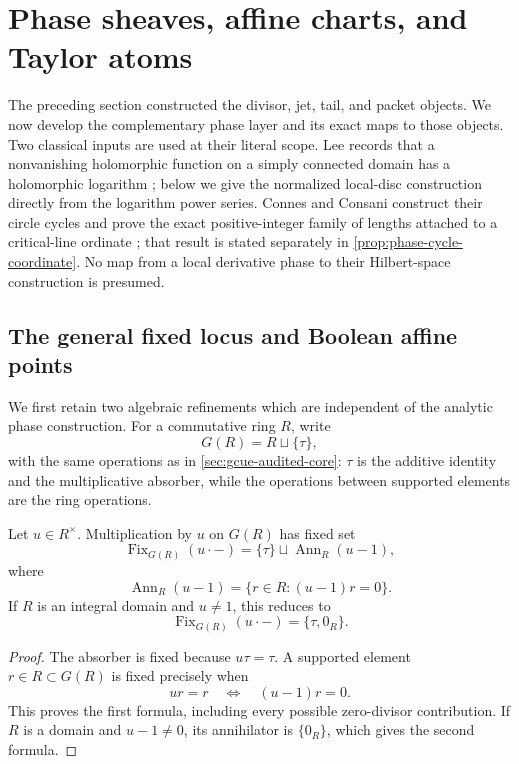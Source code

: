 \section{Phase sheaves, affine charts, and Taylor atoms}
\label{sec:phase-sheaf-audit}

The preceding section constructed the divisor, jet, tail, and packet objects.
We now develop the complementary phase layer and its exact maps to those
objects.  Two classical inputs are used at their literal scope.
Lee records that a nonvanishing holomorphic function on a simply connected
domain has a holomorphic logarithm
\cite[p.~145, Problem~5-11]{lee2024}; below we give the normalized local-disc
construction directly from the logarithm power series.  Connes and Consani
construct their circle cycles and prove the exact positive-integer family of
lengths attached to a critical-line ordinate
\cite[\S6]{connesConsani2021ZetaCycles}; that result is stated separately in
\cref{prop:phase-cycle-coordinate}.  No map from a local derivative phase to
their Hilbert-space construction is presumed.

\subsection{The general fixed locus and Boolean affine points}

We first retain two algebraic refinements which are independent of the analytic
phase construction.  For a commutative ring \(R\), write
\[
 G(R)=R\sqcup\{\tau\},
\]
with the same operations as in \cref{sec:gcue-audited-core}: \(\tau\) is the
additive identity and the multiplicative absorber, while the operations between
supported elements are the ring operations.

\begin{proposition}
\label{prop:phase-general-fixed-locus}
Let \(u\in R^\times\).  Multiplication by \(u\) on \(G(R)\) has fixed set
\[
 \operatorname{Fix}_{G(R)}(u\cdot-)
 =
 \{\tau\}\sqcup \operatorname{Ann}_R(u-1),
\]
where
\[
 \operatorname{Ann}_R(u-1)=\{r\in R:(u-1)r=0\}.
\]
If \(R\) is an integral domain and \(u\ne1\), this reduces to
\[
 \operatorname{Fix}_{G(R)}(u\cdot-)=\{\tau,0_R\}.
\]
\end{proposition}

\begin{proof}
The absorber is fixed because \(u\tau=\tau\).  A supported element
\(r\in R\subset G(R)\) is fixed precisely when
\[
 ur=r
 \quad\Longleftrightarrow\quad
 (u-1)r=0.
\]
This proves the first formula, including every possible zero-divisor
contribution.  If \(R\) is a domain and \(u-1\ne0\), its annihilator is
\(\{0_R\}\), which gives the second formula.
\end{proof}

